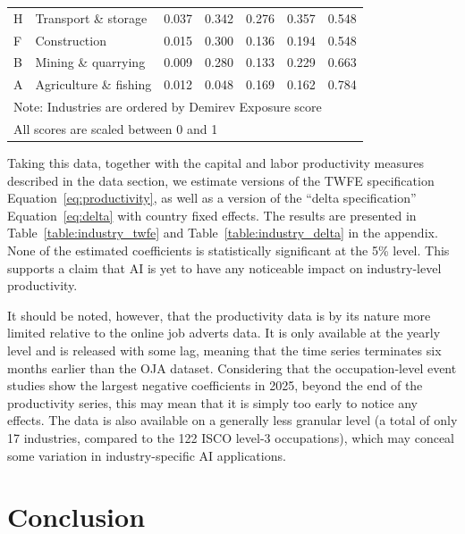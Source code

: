 \documentclass[11pt]{article}
\begin{document}
\begin{table}[htbp]
\begin{tabular}{llccccc}
H & Transport \& storage & 0.037 & 0.342 & 0.276 & 0.357 & 0.548 \\
F & Construction & 0.015 & 0.300 & 0.136 & 0.194 & 0.548 \\
B & Mining \& quarrying & 0.009 & 0.280 & 0.133 & 0.229 & 0.663 \\
A & Agriculture \& fishing & 0.012 & 0.048 & 0.169 & 0.162 & 0.784 \\
\hline\hline
\multicolumn{7}{l}{\footnotesize Note: Industries are ordered by Demirev Exposure score} \\
\multicolumn{7}{l}{\footnotesize All scores are scaled between 0 and 1} \\
\end{tabular}
\label{table:industries}
\end{table}

Taking this data, together with the capital and labor productivity measures described in the data section, we estimate versions of the TWFE specification Equation~\ref{eq:productivity}, as well as a version of the ``delta specification'' Equation~\ref{eq:delta} with country fixed effects. The results are presented in Table~\ref{table:industry_twfe} and Table~\ref{table:industry_delta} in the appendix. None of the estimated coefficients is statistically significant at the 5\% level. This supports a claim that AI is yet to have any noticeable impact on industry-level productivity.

It should be noted, however, that the productivity data is by its nature more limited relative to the online job adverts data. It is only available at the yearly level and is released with some lag, meaning that the time series terminates six months earlier than the OJA dataset. Considering that the occupation-level event studies show the largest negative coefficients in 2025, beyond the end of the productivity series, this may mean that it is simply too early to notice any effects. The data is also available on a generally less granular level (a total of only 17 industries, compared to the 122 ISCO level-3 occupations), which may conceal some variation in industry-specific AI applications.


\section{Conclusion}
\label{sec:conclusion}
\end{document}
